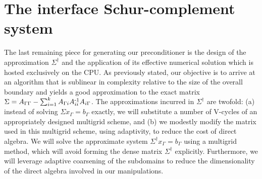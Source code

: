 \section{The interface Schur-complement system}
\label{sec:sigma-solver}

The last remaining piece for generating our preconditioner is the design of the approximation $\Sigma^\dagger$ and the application of its effective numerical
solution which is hosted exclusively on the CPU. As previously stated, our objective is to arrive at an algorithm that is sublinear in complexity relative to the
size of the overall boundary and yields a good approximation to the exact matrix
$\Sigma=A_{\Gamma\Gamma}-\sum_{i=1}^kA_{\Gamma i}A_{ii}^{\operatorname{-1}}A_{i \Gamma}$.
\changed
{The approximations incurred in $\Sigma^\dagger$ are twofold: (a) instead of solving $\Sigma x_\Gamma=b_\Gamma$ exactly, we will substitute a number of V-cycles of an
  appropriately designed multigrid scheme, and (b) we modestly modify the matrix used in this multigrid scheme, using adaptivity, to reduce the cost of direct algebra.}
{We will solve the approximate system $\Sigma^\dagger x_\Gamma=b_\Gamma$ using a multigrid method, which will avoid forming the dense matrix $\Sigma^\dagger$
explicitly. Furthermore, we will leverage adaptive coarsening of the subdomains to reduce the dimensionality of the direct algebra involved in our manipulations.}

